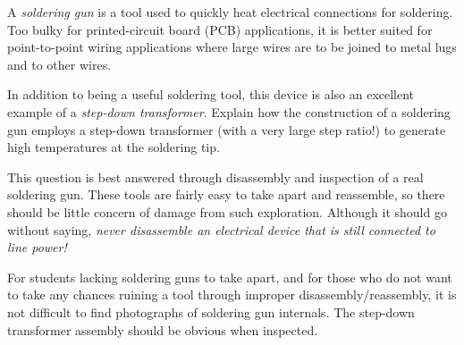 

A {\it soldering gun} is a tool used to quickly heat electrical connections for soldering.  Too bulky for printed-circuit board (PCB) applications, it is better suited for point-to-point wiring applications where large wires are to be joined to metal lugs and to other wires.

In addition to being a useful soldering tool, this device is also an excellent example of a {\it step-down transformer}.  Explain how the construction of a soldering gun employs a step-down transformer (with a very large step ratio!) to generate high temperatures at the soldering tip.







This question is best answered through disassembly and inspection of a real soldering gun.  These tools are fairly easy to take apart and reassemble, so there should be little concern of damage from such exploration.  Although it should go without saying, {\it never disassemble an electrical device that is still connected to line power!}







For students lacking soldering guns to take apart, and for those who do not want to take any chances ruining a tool through improper disassembly/reassembly, it is not difficult to find photographs of soldering gun internals.  The step-down transformer assembly should be obvious when inspected.




